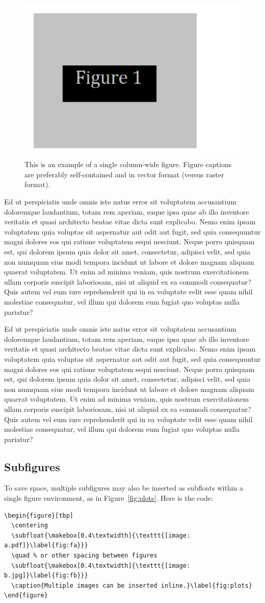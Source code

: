 \documentclass[10pt,a4paper,twoside]{article}
\begin{document}
\begin{figure}[tb]
\centering
\includegraphics[width=0.3\linewidth]{figure1.pdf}
\caption{This is an example of a single column-wide figure. Figure captions are preferably self-contained and in vector format (versus raster format).}
\label{fig:plot1}
\end{figure}

Ed ut perspiciatis unde omnis iste natus error sit voluptatem accusantium doloremque laudantium, totam rem aperiam, eaque ipsa quae ab illo inventore veritatis et quasi architecto beatae vitae dicta sunt explicabo. Nemo enim ipsam voluptatem quia voluptas sit aspernatur aut odit aut fugit, sed quia consequuntur magni dolores eos qui ratione voluptatem sequi nesciunt. Neque porro quisquam est, qui dolorem ipsum quia dolor sit amet, consectetur, adipisci velit, sed quia non numquam eius modi tempora incidunt ut labore et dolore magnam aliquam quaerat voluptatem. Ut enim ad minima veniam, quis nostrum exercitationem ullam corporis suscipit laboriosam, nisi ut aliquid ex ea commodi consequatur? Quis autem vel eum iure reprehenderit qui in ea voluptate velit esse quam nihil molestiae consequatur, vel illum qui dolorem eum fugiat quo voluptas nulla pariatur?

Ed ut perspiciatis unde omnis iste natus error sit voluptatem accusantium doloremque laudantium, totam rem aperiam, eaque ipsa quae ab illo inventore veritatis et quasi architecto beatae vitae dicta sunt explicabo. Nemo enim ipsam voluptatem quia voluptas sit aspernatur aut odit aut fugit, sed quia consequuntur magni dolores eos qui ratione voluptatem sequi nesciunt. Neque porro quisquam est, qui dolorem ipsum quia dolor sit amet, consectetur, adipisci velit, sed quia non numquam eius modi tempora incidunt ut labore et dolore magnam aliquam quaerat voluptatem. Ut enim ad minima veniam, quis nostrum exercitationem ullam corporis suscipit laboriosam, nisi ut aliquid ex ea commodi consequatur? Quis autem vel eum iure reprehenderit qui in ea voluptate velit esse quam nihil molestiae consequatur, vel illum qui dolorem eum fugiat quo voluptas nulla pariatur?


\subsection{Subfigures}
To save space, multiple subfigures may also be inserted as subfloats within a single figure environment, as in Figure~\ref{fig:plots}. Here is the code:
\begin{verbatim}
\begin{figure}[tbp]
  \centering
  \subfloat{\makebox[0.4\textwidth]{\texttt{[image: a.pdf]}\label{fig:fa}}}
  \quad % or other spacing between figures
  \subfloat{\makebox[0.4\textwidth]{\texttt{[image: b.jpg]}\label{fig:fb}}}
  \caption{Multiple images can be inserted inline.}\label{fig:plots}
\end{figure}
\end{verbatim}
\end{document}
